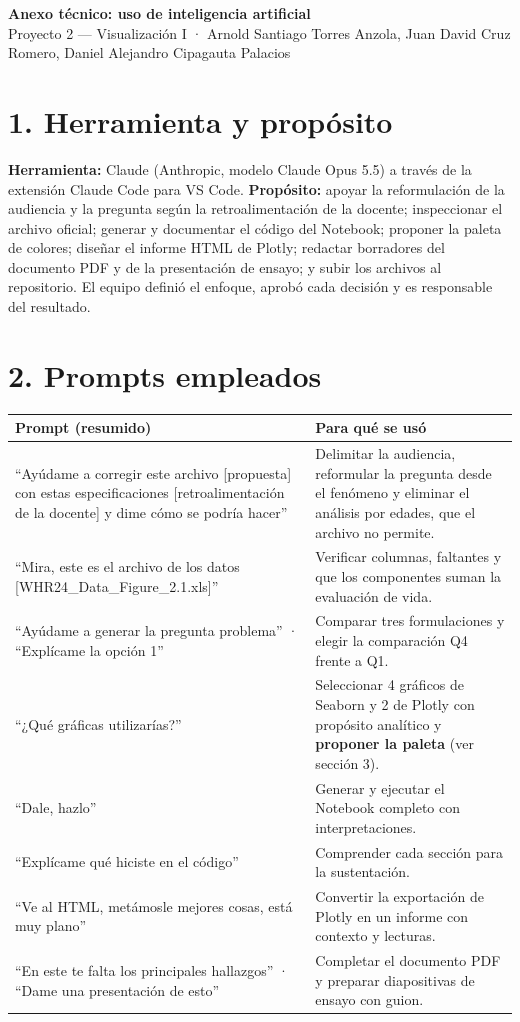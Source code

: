 \documentclass[10pt,a4paper]{article}
\begin{document}
{\large\textbf{Anexo técnico: uso de inteligencia artificial}}\\
Proyecto 2 --- Visualización I · Arnold Santiago Torres Anzola, Juan David Cruz Romero, Daniel Alejandro Cipagauta Palacios

\section*{1. Herramienta y propósito}
\textbf{Herramienta:} Claude (Anthropic, modelo Claude Opus 5.5) a través de la extensión Claude Code para VS Code.
\textbf{Propósito:} apoyar la reformulación de la audiencia y la pregunta según la retroalimentación de la docente;
inspeccionar el archivo oficial; generar y documentar el código del Notebook; proponer la paleta de colores;
diseñar el informe HTML de Plotly; redactar borradores del documento PDF y de la presentación de ensayo; y subir
los archivos al repositorio. El equipo definió el enfoque, aprobó cada decisión y es responsable del resultado.

\section*{2. Prompts empleados}
\small
\begin{tabularx}{\textwidth}{@{}p{7.3cm}L@{}}
\toprule
\textbf{Prompt (resumido)} & \textbf{Para qué se usó} \\
\midrule
``Ayúdame a corregir este archivo [propuesta] con estas especificaciones [retroalimentación de la docente] y dime cómo se podría hacer'' & Delimitar la audiencia, reformular la pregunta desde el fenómeno y eliminar el análisis por edades, que el archivo no permite. \\
``Mira, este es el archivo de los datos [WHR24\_Data\_Figure\_2.1.xls]'' & Verificar columnas, faltantes y que los componentes suman la evaluación de vida. \\
``Ayúdame a generar la pregunta problema'' · ``Explícame la opción 1'' & Comparar tres formulaciones y elegir la comparación Q4 frente a Q1. \\
``¿Qué gráficas utilizarías?'' & Seleccionar 4 gráficos de Seaborn y 2 de Plotly con propósito analítico y \textbf{proponer la paleta} (ver sección 3). \\
``Dale, hazlo'' & Generar y ejecutar el Notebook completo con interpretaciones. \\
``Explícame qué hiciste en el código'' & Comprender cada sección para la sustentación. \\
``Ve al HTML, metámosle mejores cosas, está muy plano'' & Convertir la exportación de Plotly en un informe con contexto y lecturas. \\
``En este te falta los principales hallazgos'' · ``Dame una presentación de esto'' & Completar el documento PDF y preparar diapositivas de ensayo con guion. \\
\bottomrule
\end{tabularx}
\normalsize
\end{document}
